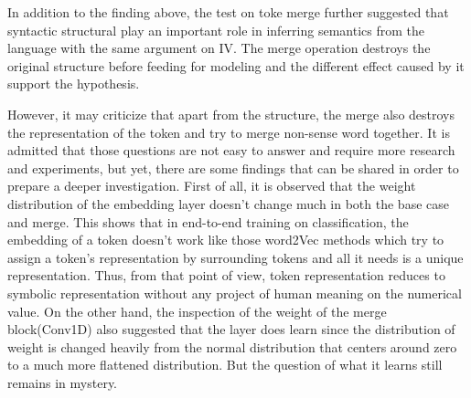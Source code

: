\documentclass[12pt]{article}
\begin{document}
In addition to the finding above, the test on toke merge further suggested that syntactic structural play an important role in inferring semantics from the language with the same argument on IV. The merge operation destroys the original structure before feeding for modeling and the different effect caused by it support the hypothesis. 

However, it may criticize that apart from the structure, the merge also destroys the representation of the token and try to merge non-sense word together. It is admitted that those questions are not easy to answer and require more research and experiments, but yet, there are some findings that can be shared in order to prepare a deeper investigation. First of all, it is observed that the weight distribution of the embedding layer doesn't change much in both the base case and merge. This shows that in end-to-end training on classification, the embedding of a token doesn't work like those word2Vec methods which try to assign a token's representation by surrounding tokens and all it needs is a unique representation. Thus, from that point of view, token representation reduces to symbolic representation without any project of human meaning on the numerical value. On the other hand, the inspection of the weight of the merge block(Conv1D) also suggested that the layer does learn since the distribution of weight is changed heavily from the normal distribution that centers around zero to a much more flattened distribution. But the question of what it learns still remains in mystery. 
\end{document}
